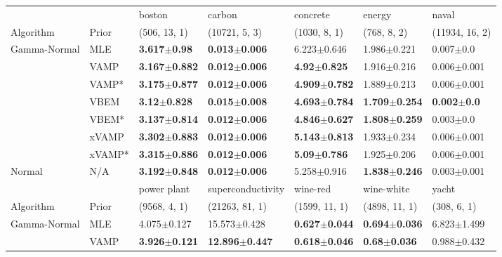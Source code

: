 \begin{tabular}{lllllll}
\toprule
       &     &                    boston &                    carbon &                  concrete &                    energy &                   naval \\
Algorithm & Prior& (506, 13, 1)& (10721, 5, 3)& (1030, 8, 1)& (768, 8, 2)& (11934, 16, 2)\\
\midrule
Gamma-Normal & MLE &   \textbf{3.617$\pm$0.98} &  \textbf{0.013$\pm$0.006} &           6.223$\pm$0.646 &           1.986$\pm$0.221 &           0.007$\pm$0.0 \\
       & VAMP &  \textbf{3.167$\pm$0.882} &  \textbf{0.012$\pm$0.006} &   \textbf{4.92$\pm$0.825} &           1.916$\pm$0.216 &         0.006$\pm$0.001 \\
       & VAMP* &  \textbf{3.175$\pm$0.877} &  \textbf{0.012$\pm$0.006} &  \textbf{4.909$\pm$0.782} &           1.889$\pm$0.213 &         0.006$\pm$0.001 \\
       & VBEM &   \textbf{3.12$\pm$0.828} &  \textbf{0.015$\pm$0.008} &  \textbf{4.693$\pm$0.784} &  \textbf{1.709$\pm$0.254} &  \textbf{0.002$\pm$0.0} \\
       & VBEM* &  \textbf{3.137$\pm$0.814} &  \textbf{0.012$\pm$0.006} &  \textbf{4.846$\pm$0.627} &  \textbf{1.808$\pm$0.259} &           0.003$\pm$0.0 \\
       & xVAMP &  \textbf{3.302$\pm$0.883} &  \textbf{0.012$\pm$0.006} &  \textbf{5.143$\pm$0.813} &           1.933$\pm$0.234 &         0.006$\pm$0.001 \\
       & xVAMP* &  \textbf{3.315$\pm$0.886} &  \textbf{0.012$\pm$0.006} &   \textbf{5.09$\pm$0.786} &           1.925$\pm$0.206 &         0.006$\pm$0.001 \\
Normal & N/A &  \textbf{3.192$\pm$0.848} &  \textbf{0.012$\pm$0.006} &           5.258$\pm$0.916 &  \textbf{1.838$\pm$0.246} &         0.003$\pm$0.001 \\
\midrule
       &     &               power plant &          superconductivity &                  wine-red &                wine-white &                     yacht \\
Algorithm & Prior& (9568, 4, 1)& (21263, 81, 1)& (1599, 11, 1)& (4898, 11, 1)& (308, 6, 1)\\
\midrule
Gamma-Normal & MLE &           4.075$\pm$0.127 &           15.573$\pm$0.428 &  \textbf{0.627$\pm$0.044} &  \textbf{0.694$\pm$0.036} &           6.823$\pm$1.499 \\
       & VAMP &  \textbf{3.926$\pm$0.121} &  \textbf{12.896$\pm$0.447} &  \textbf{0.618$\pm$0.046} &   \textbf{0.68$\pm$0.036} &           0.988$\pm$0.432 \\

\end{tabular}
